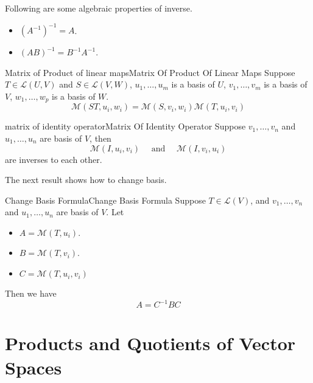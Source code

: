 \documentclass[../main.tex]{subfiles}
\begin{document}
Following are some algebraic properties of inverse.
\begin{itemize}
\item $\left(A ^{-1}\right)^{-1}=A$.
\item $\left(AB\right)^{-1} = B ^{-1}A ^{-1}$.
\end{itemize}

\begin{theorem}{Matrix of Product of linear maps}{Matrix Of Product Of Linear Maps}
Suppose $T\in \mathscr{L}(U,V)$ and $S\in \mathscr{L}(V,W)$, $u_1, \ldots ,u_m$ is a basis of $U$, $v_1, \ldots , v_m$ is a basis of $V$, $w_1, \ldots , w_p$ is a basis of $W$.
\begin{equation*}
\mathscr{M}(ST,u_i,w_i) = \mathscr{M}(S,v_i,w_i)\mathscr{M}(T,u_i,v_i)
\end{equation*}
\end{theorem}

\begin{theorem}{matrix of identity operator}{Matrix Of Identity Operator}
Suppose $v_1, \ldots , v_n$ and $u_1, \ldots , u_n$ are basis of $V$, then
\begin{equation}
\mathscr{M}(I,u_i,v_i) \quad \text{ and }\quad \mathscr{M}(I,v_i,u_i)
\end{equation}
are inverses to each other.
\end{theorem}

The next result shows how to change basis.
\begin{theorem}{Change Basis Formula}{Change Basis Formula}
Suppose $T\in \mathscr{L}(V)$, and $v_1, \ldots , v_n$ and $u_1, \ldots , u_n$ are basis of $V$. Let
\begin{itemize}
\item $A=\mathscr{M}(T,u_i)$.
\item $B=\mathscr{M}(T,v_i)$.
\item $C=\mathscr{M}(T,u_i,v_i)$
\end{itemize}
Then we have
\begin{equation}
A = C ^{-1}BC
\end{equation}
\end{theorem}


\section{Products and Quotients of Vector Spaces}
\end{document}
